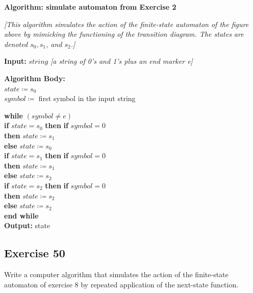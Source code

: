 \documentclass[14pt]{extarticle}
\newcommand{\cy}{\color{cyan}}
\begin{document}
\begin{tcolorbox}[colframe=cyan]
{\bf \cy Algorithm: simulate automaton from Exercise 2}

{\it [This algorithm simulates the action of the finite-state automaton of the figure above by mimicking the functioning of 
the transition diagram. The states are denoted \(s_0, s_1\), and \(s_2\).]}

{\bf Input:} \(string\) {\it [a string of 0’s and 1’s plus an end marker e]}

{\bf Algorithm Body:} \\
\(state \coloneqq s_0\) \\
\(symbol \coloneqq\) first symbol in the input string

\begin{tabbing}
{\bf while} \= \((symbol \neq e)\) \\
            \> {\bf if} \(state = s_0\) {\bf then} \= {\bf if} \(symbol = 0\) \\
            \>                                     \> {\bf then} \(state \coloneqq s_1\) \\
            \>                                     \> {\bf else} \(state \coloneqq s_0\) \\
            \> {\bf if} \(state = s_1\) {\bf then} \= {\bf if} \(symbol = 0\) \\
            \>                                     \> {\bf then} \(state \coloneqq s_1\) \\
            \>                                     \> {\bf else} \(state \coloneqq s_2\) \\
            \> {\bf if} \(state = s_2\) {\bf then} \= {\bf if} \(symbol = 0\) \\
            \>                                     \> {\bf then} \(state \coloneqq s_2\) \\
            \>                                     \> {\bf else} \(state \coloneqq s_2\) \\
{\bf end while} \\
{\bf Output:} state
\end{tabbing}
\end{tcolorbox}

\subsection{Exercise 50}
Write a computer algorithm that simulates the action of the finite-state automaton of exercise 8 by repeated application 
of the next-state function.
\end{document}
